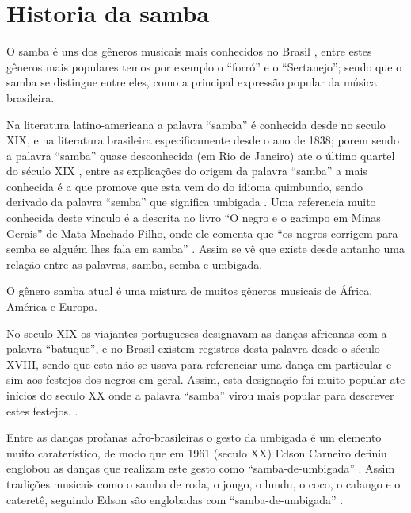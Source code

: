 \section{Historia da samba}
O samba é uns dos gêneros musicais mais conhecidos no Brasil \cite[pp. 46-47]{diniz2008almanaque},
entre estes gêneros mais populares temos por exemplo o ``forró'' e o ``Sertanejo'';
sendo que o samba se distingue entre eles, como a principal expressão popular da música brasileira. 

Na literatura latino-americana a palavra ``samba'' é conhecida desde no seculo XIX, 
e na literatura brasileira especificamente desde o ano de 1838; porem sendo a palavra ``samba''
quase desconhecida (em Rio de Janeiro) ate o último quartel do século XIX  \cite[pp. 47]{diniz2008almanaque}\cite[pp. 86]{sandroni2001feitico},
entre as explicações
do origem da palavra ``samba'' a mais conhecida é a que promove que esta vem do 
do idioma quimbundo, sendo derivado da palavra ``semba''  que significa umbigada \cite[pp. 47]{diniz2008almanaque} \cite{da2015historia}.
Uma referencia muito conhecida deste vinculo é a descrita no livro ``O negro e o garimpo em Minas Gerais''
de Mata Machado Filho, onde ele comenta que ``os negros corrigem para semba se 
alguém lhes fala em samba'' \cite[pp. 85]{sandroni2001feitico}. Assim se vê que existe
desde antanho uma relação entre as palavras, 
samba, semba e umbigada.

O gênero samba atual é uma mistura de muitos gêneros musicais de África, América e Europa.


No seculo XIX os viajantes portugueses designavam as danças africanas com a palavra ``batuque'',
e no Brasil existem registros desta palavra desde o século XVIII, sendo que
esta não se usava para referenciar uma dança em particular e sim aos festejos dos negros em geral.
Assim, esta designação foi muito popular ate inícios do seculo XX onde a palavra ``samba''
 virou mais popular para descrever estes festejos. 
\cite[pp. 85]{sandroni2001feitico}.

Entre as danças profanas afro-brasileiras o gesto da umbigada é um elemento muito caraterístico,
de modo que em 1961 (seculo XX) Edson Carneiro definiu englobou as danças que realizam este 
gesto como ``samba-de-umbigada'' . Assim tradições 
musicais como o samba de roda, o jongo, o lundu, o coco, o calango e o cateretê, 
seguindo Edson são englobadas com  ``samba-de-umbigada'' \cite[pp. 85]{sandroni2001feitico}.

